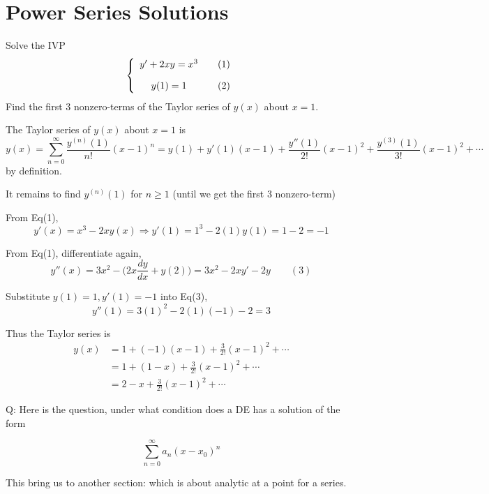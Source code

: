 \chapter{Power Series Solutions}

\begin{example}
    Solve the IVP 
    \[
        \left\{
        \begin{array}{cc}
         y' + 2xy = x^3 & \quad \refstepcounter{equation}(1)\\[1em]
         y(1) = 1 & \quad \refstepcounter{equation}(2)
        \end{array}
        \right.
    \]
    Find the first 3 nonzero-terms of the Taylor series of $y(x)$ about $x=1$.
\end{example}
\begin{solution}
    The Taylor series of $y(x)$ about $x=1$ is 
    \[
        y(x) = \sum^\infty_{n=0} \frac{y^{(n)}(1)}{n!}(x-1)^n = 
        y(1) + y'(1)(x-1) + \frac{y''(1)}{2!}(x-1)^2 + 
        \frac{y^{(3)}(1)}{3!}(x-1)^2 + \cdots
    \]
    by definition.

    It remains to find $y^{(n)}(1)$ for $n \geq 1$ (until we get the first 3 nonzero-term)

    From Eq(1), 
    \[
        y'(x) = x^3 -2xy(x) \Rightarrow y'(1) = 1^3 - 2(1)y(1) = 1 - 2 = -1 
    \]

    From Eq(1), differentiate again,
    \[
        y''(x) = 3x^2 - \biggl(2x\frac{dy}{dx} + y(2)\biggr) = 3x^2 - 2xy' -2y \quad \quad (3)
    \]

    Substitute $y(1)= 1, y'(1) = -1$ into Eq(3),
    \[
        y''(1) = 3(1)^2 - 2(1)(-1) - 2 = 3
    \]

    Thus the Taylor series is 
    \begin{align*}
        y(x) &= 1 + (-1)(x-1) + \frac{3}{2!}(x-1)^2 + \cdots \\
        &= 1 + (1-x) + \frac{3}{2!}(x-1)^2 + \cdots \\ 
        &= 2 - x + \frac{3}{2!}(x-1)^2 + \cdots
    \end{align*}
\end{solution}

Q: Here is the question, under what condition does a DE has a solution of the form 

\begin{equation}
    \sum^\infty_{n=0} a_n (x - x_0)^n 
\end{equation}

This bring us to another section: which is about analytic at a point for a series.

